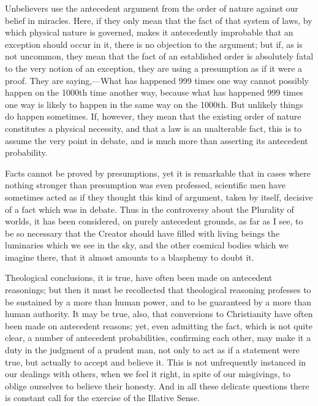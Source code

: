 Unbelievers use the antecedent argument from the order of nature
against our belief in miracles. Here, if they only mean that the fact
of that system of laws, by which physical nature is governed, makes it
antecedently improbable that an exception should occur in it, there is
no objection to the argument; but if, as is not uncommon, they mean
that the fact of an established order is absolutely fatal to the very
notion of an exception, they are using a presumption as if it were a
proof. They are saying,—What has happened 999 times one way cannot
possibly happen on the 1000th time another way, because what has
happened 999 times one way is likely to happen in the same way on the
1000th. But unlikely things do happen sometimes. If, however, they
mean that the existing order of nature constitutes a physical
necessity, and that a law is an unalterable fact, this is to assume
the very point in debate, and is much more than asserting its
antecedent probability.

Facts cannot be proved by presumptions, yet it is remarkable that
in cases where nothing stronger than presumption was even professed,
scientific men have sometimes acted as if they thought this kind of
argument, taken by itself, decisive of a fact which was in debate.
Thus in the controversy about the Plurality of worlds, it has been
considered, on purely antecedent grounds, as far as I see, to be so
necessary that the Creator should have filled with living beings the
luminaries which we see in the sky, and the other cosmical bodies
which we imagine there, that it almost amounts to a blasphemy to doubt
it.

Theological conclusions, it is true, have often been made on
antecedent reasonings; but then it must be recollected that
theological reasoning professes to be sustained by a more than human
power, and to be guaranteed by a more than human authority. It may be
true, also, that conversions to Christianity have often been made on
antecedent reasons; yet, even admitting the fact, which is not quite
clear, a number of antecedent probabilities, confirming each other,
may make it a duty in the judgment of a prudent man, not only to act
as if a statement were true, but actually to accept and believe it.
This is not unfrequently instanced in our dealings with others, when
we feel it right, in spite of our misgivings, to oblige ourselves to
believe their honesty. And in all these delicate questions there is
constant call for the exercise of the Illative Sense.



